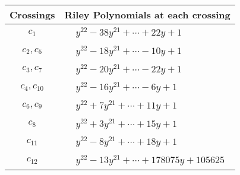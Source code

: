 \documentclass[1p]{elsarticle_modified}
\theoremstyle{definition}
\begin{document}
\begin{tabular}{m{50pt}|m{274pt}}
Crossings & \hspace{64pt}Riley Polynomials at each crossing \\
\hline $$\begin{aligned}c_{1}\end{aligned}$$&$\begin{aligned}
&y^{22}-38 y^{21}+\cdots+22 y+1
\end{aligned}$\\
\hline $$\begin{aligned}c_{2},c_{5}\end{aligned}$$&$\begin{aligned}
&y^{22}-18 y^{21}+\cdots-10 y+1
\end{aligned}$\\
\hline $$\begin{aligned}c_{3},c_{7}\end{aligned}$$&$\begin{aligned}
&y^{22}-20 y^{21}+\cdots-22 y+1
\end{aligned}$\\
\hline $$\begin{aligned}c_{4},c_{10}\end{aligned}$$&$\begin{aligned}
&y^{22}-16 y^{21}+\cdots-6 y+1
\end{aligned}$\\
\hline $$\begin{aligned}c_{6},c_{9}\end{aligned}$$&$\begin{aligned}
&y^{22}+7 y^{21}+\cdots+11 y+1
\end{aligned}$\\
\hline $$\begin{aligned}c_{8}\end{aligned}$$&$\begin{aligned}
&y^{22}+3 y^{21}+\cdots+15 y+1
\end{aligned}$\\
\hline $$\begin{aligned}c_{11}\end{aligned}$$&$\begin{aligned}
&y^{22}-8 y^{21}+\cdots+18 y+1
\end{aligned}$\\
\hline $$\begin{aligned}c_{12}\end{aligned}$$&$\begin{aligned}
&y^{22}-13 y^{21}+\cdots+178075 y+105625
\end{aligned}$\\
\hline
\end{tabular}\\~\\
\end{document}
